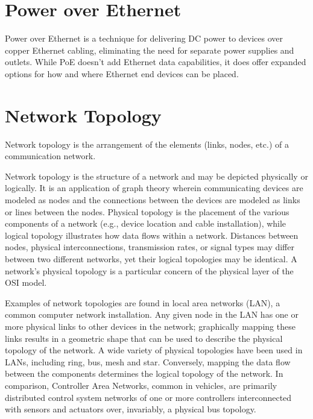 \documentclass[a4paper,12pt]{book}
\begin{document}
\section{Power over Ethernet}
Power over Ethernet is a technique for delivering DC power to devices over copper Ethernet cabling, eliminating the need for separate power supplies and outlets. While PoE doesn't add Ethernet data capabilities, it does offer expanded options for how and where Ethernet end devices can be placed.


\section{Network Topology}

Network topology is the arrangement of the elements (links, nodes, etc.) of a communication network.

Network topology is the structure of a network and may be depicted physically or logically. It is an application of graph theory wherein communicating devices are modeled as nodes and the connections between the devices are modeled as links or lines between the nodes. Physical topology is the placement of the various components of a network (e.g., device location and cable installation), while logical topology illustrates how data flows within a network. Distances between nodes, physical interconnections, transmission rates, or signal types may differ between two different networks, yet their logical topologies may be identical. A network’s physical topology is a particular concern of the physical layer of the OSI model.

Examples of network topologies are found in local area networks (LAN), a common computer network installation. Any given node in the LAN has one or more physical links to other devices in the network; graphically mapping these links results in a geometric shape that can be used to describe the physical topology of the network. A wide variety of physical topologies have been used in LANs, including ring, bus, mesh and star. Conversely, mapping the data flow between the components determines the logical topology of the network. In comparison, Controller Area Networks, common in vehicles, are primarily distributed control system networks of one or more controllers interconnected with sensors and actuators over, invariably, a physical bus topology.
\clearpage
\end{document}
